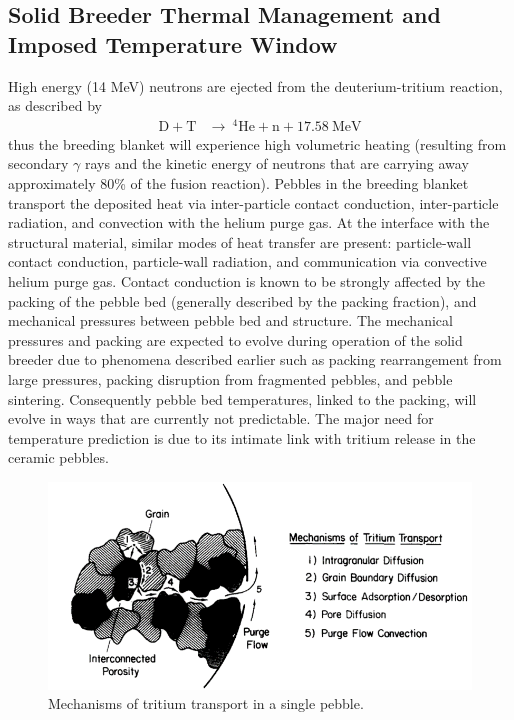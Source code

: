 \subsection{Solid Breeder Thermal Management and Imposed Temperature Window}
High energy (14 MeV) neutrons are ejected from the deuterium-tritium reaction, as described by 
\begin{align}
    \mathrm{D} + \mathrm{T}&\xrightarrow{}\ ^4\mathrm{He}+\mathrm{n}+17.58\ \text{MeV} \label{eq:dt-reaction}
\end{align}
thus the breeding blanket will experience high volumetric heating (resulting from secondary $\gamma$ rays and the kinetic energy of neutrons that are carrying away approximately 80\% of the fusion reaction). Pebbles in the breeding blanket transport the deposited heat via inter-particle contact conduction, inter-particle radiation, and convection with the helium purge gas. At the interface with the structural material, similar modes of heat transfer are present: particle-wall contact conduction, particle-wall radiation, and communication via convective helium purge gas. Contact conduction is known to be strongly affected by the packing of the pebble bed (generally described by the packing fraction), and mechanical pressures between pebble bed and structure. The mechanical pressures and packing are expected to evolve during operation of the solid breeder due to phenomena described earlier such as packing rearrangement from large pressures, packing disruption from fragmented pebbles, and pebble sintering. Consequently pebble bed temperatures, linked to the packing, will evolve in ways that are currently not predictable. The major need for temperature prediction is due to its intimate link with tritium release in the ceramic pebbles.

\begin{figure}[ht]
    \centering
    \includegraphics[width=\singleimagewidth]{figures/mechanisms_tritium_transport} 
    \caption{Mechanisms of tritium transport in a single pebble\cite{Federici1990}.}
    \label{fig:mechanisms_tritium_transport}
\end{figure}

